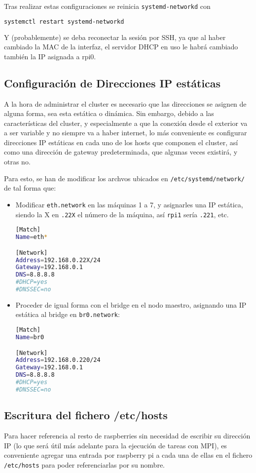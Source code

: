 Tras realizar estas configuraciones se reinicia \texttt{systemd-networkd} con
\begin{lstlisting}[language=bash]
systemctl restart systemd-networkd
\end{lstlisting}

Y (probablemente) se deba reconectar la sesión por SSH, ya que al haber cambiado la MAC de la interfaz, el servidor DHCP en uso le habrá cambiado también la IP asignada a rpi0.

\subsection{Configuración de Direcciones IP estáticas}
\label{ssec:configuracion_ip_estaticas}
A la hora de administrar el cluster es necesario que las direcciones se asignen de alguna forma, sea esta estática o dinámica. Sin embargo, debido a las características del cluster, y especialmente a que la conexión desde el exterior va a ser variable y no siempre va a haber internet, lo más conveniente es configurar direcciones IP estáticas en cada uno de los hosts que componen el cluster, así como una dirección de gateway predeterminada, que algunas veces existirá, y otras no.

Para esto, se han de modificar los archvos ubicados en \texttt{/etc/systemd/network/} de tal forma que:

\begin{itemize}
    \item Modificar \texttt{eth.network} en las máquinas 1 a 7, y asignarles una IP estática, siendo la X en \texttt{.22X} el número de la máquina, así \texttt{rpi1} sería \texttt{.221}, etc.
\begin{lstlisting}[language=bash]
[Match]
Name=eth*

[Network]
Address=192.168.0.22X/24
Gateway=192.168.0.1
DNS=8.8.8.8
#DHCP=yes
#DNSSEC=no
\end{lstlisting}
    \item Proceder de igual forma con el bridge en el nodo maestro, asignando una IP estática al bridge en \texttt{br0.network}:
\begin{lstlisting}[language=bash]
[Match]
Name=br0

[Network]
Address=192.168.0.220/24
Gateway=192.168.0.1
DNS=8.8.8.8
#DHCP=yes
#DNSSEC=no
\end{lstlisting}
\end{itemize}

\subsection{Escritura del fichero /etc/hosts}
Para hacer referencia al resto de raspberries sin necesidad de escribir su dirección IP (lo que será útil más adelante para la ejecución de tareas con MPI), es conveniente agregar una entrada por raspberry pi a cada una de ellas en el fichero \texttt{/etc/hosts} para poder referenciarlas por su nombre.

